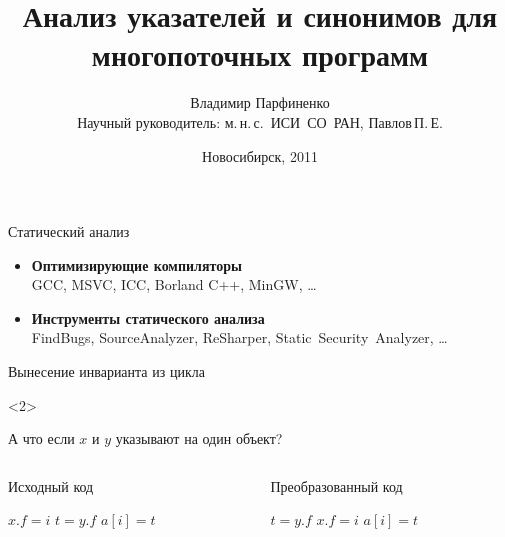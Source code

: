 \documentclass[usenames,dvipsnames,pdftex,unicode]{beamer}
\title[Анализ указателей и синонимов]{
  Анализ указателей и синонимов для многопоточных программ
}
\author[Владимир Парфиненко]{
  Владимир Парфиненко
  \texorpdfstring{%
    \\ \small Научный руководитель: м.\,н.\,с.~ИСИ~СО~РАН, Павлов\,П.\,Е.
  }{}%
}
\institute{
  Новосибирский Государственный Университет
}
\date{
  Новосибирск, 2011
}
\begin{document}
\begin{frame}
  \titlepage
\end{frame}

\begin{frame}{Статический анализ}

  \begin{itemize}
    \item \textbf{Оптимизирующие компиляторы}\\
        GCC, MSVC, ICC, Borland C++, MinGW, \ldots
    \item \textbf{Инструменты статического анализа}\\
        FindBugs, SourceAnalyzer, ReSharper, Static~Security~Analyzer, \ldots
  \end{itemize}

\end{frame}

\begin{frame}{Вынесение инварианта из цикла}

  \begin{visibleenv}<2>
    \begin{center}
      \large А что если $x$ и $y$ указывают на один объект?
    \end{center}
  \end{visibleenv}

  \begin{columns}[t]
    \begin{column}{5cm}
      \begin{block}{Исходный код}
        \begin{algorithmic}
          \STATE $x.f = i$
          \STATE $t = y.f$
          \STATE $a[i] = t$
          \ENDFOR
        \end{algorithmic}
      \end{block}
    \end{column}
    \begin{column}{5cm}
      \begin{block}{Преобразованный код}
        \begin{algorithmic}
          \STATE $t = y.f$
          \STATE $x.f = i$
          \STATE $a[i] = t$
          \ENDFOR
        \end{algorithmic}
      \end{block}
    \end{column}
  \end{columns}

\end{frame}
\end{document}
